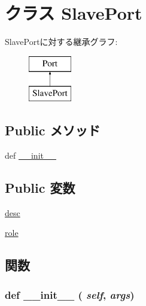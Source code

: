 \hypertarget{classm5_1_1params_1_1SlavePort}{
\section{クラス SlavePort}
\label{classm5_1_1params_1_1SlavePort}
}
SlavePortに対する継承グラフ:\begin{figure}[H]
\begin{center}
\leavevmode
\includegraphics[height=2cm]{classm5_1_1params_1_1SlavePort}
\end{center}
\end{figure}
\subsection*{Public メソッド}
\begin{DoxyCompactItemize}
\item 
def \hyperlink{classm5_1_1params_1_1SlavePort_ac775ee34451fdfa742b318538164070e}{\_\-\_\-init\_\-\_\-}
\end{DoxyCompactItemize}
\subsection*{Public 変数}
\begin{DoxyCompactItemize}
\item 
\hyperlink{classm5_1_1params_1_1SlavePort_aafc566bb08a9f46485e7238669581c2b}{desc}
\item 
\hyperlink{classm5_1_1params_1_1SlavePort_a4e0cdb878325d53ad79a74504bf97a96}{role}
\end{DoxyCompactItemize}


\subsection{関数}
\hypertarget{classm5_1_1params_1_1SlavePort_ac775ee34451fdfa742b318538164070e}{
\subsubsection[{\_\-\_\-init\_\-\_\-}]{\setlength{\rightskip}{0pt plus 5cm}def \_\-\_\-init\_\-\_\- ( {\em self}, \/   {\em args})}}
\label{classm5_1_1params_1_1SlavePort_ac775ee34451fdfa742b318538164070e}



